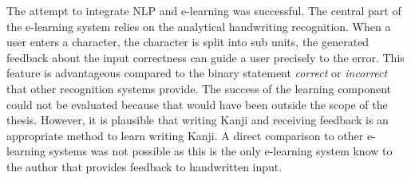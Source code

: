 The attempt to integrate NLP and e-learning was successful. The central part of
the e-learning system relies on the analytical handwriting recognition. 
When a user enters a character, the character is split into sub units, 
the generated feedback about the input correctness can guide a user precisely 
to the error. This feature is advantageous compared to the binary statement 
\emph{correct} or \emph{incorrect} that other recognition systems provide.
The success of the learning component could not be evaluated because that would
have been outside the scope of the thesis. However, it is plausible that writing
Kanji and receiving feedback is an appropriate method to learn writing
Kanji. A direct comparison to other e-learning systems was not possible as this
is the only e-learning system know to the author that provides feedback to
handwritten input. 

